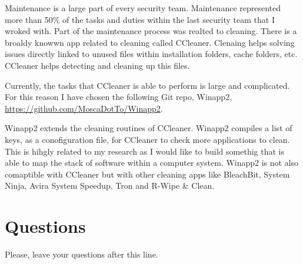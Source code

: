 \documentclass[article]{IEEEtran}
\begin{document}
Maintenance is a large part of every security team. Maintenance represented more than 50\% of the tasks and duties within the last security team that I wroked with. Part of the maintenance process was realted to cleaning. There is a broaldy knowwn app related to cleaning called CCleaner. Clenaing helps solving issues directly linked to unused files within installation folders, cache folders, etc. CCleaner helps detecting and cleaning up this files.

Currently, the tasks that CCleaner is able to perform is large and complicated. For this reason I have chosen the following Git repo, Winapp2, \url{https://github.com/MoscaDotTo/Winapp2}.

Winapp2 extends the cleaning routines of CCleaner. Winapp2 compiles a list of keys, as a conofiguration file, for CCleaner to check more applications to clean. This is hihgly related to my research as I would like to build somethig that is able to map the stack of software within a computer system. Winapp2 is not also comaptible with CCleaner but with other cleaning apps like BleachBit, System Ninja, Avira System Speedup, Tron and R-Wipe & Clean.


\section{Questions}
Please, leave your questions after this line.





\end{document}
